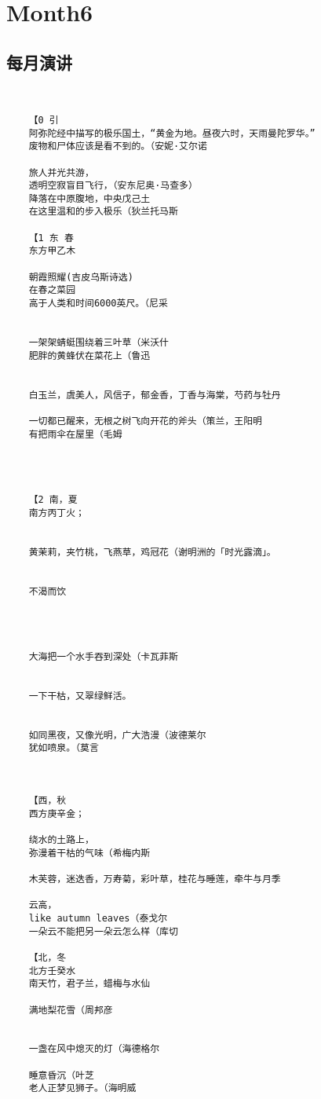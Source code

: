 \documentclass[UTF8]{Diaries}
\begin{document}
\section{Month6}
\subsection{每月演讲}
\begin{lstlisting}


    【0 引
    阿弥陀经中描写的极乐国土，“黄金为地。昼夜六时，天雨曼陀罗华。”
    废物和尸体应该是看不到的。（安妮·艾尔诺

    旅人并光共游，
    透明空寂盲目飞行，（安东尼奥·马查多）
    降落在中原腹地，中央戊己土
    在这里温和的步入极乐（狄兰托马斯

    【1 东 春
    东方甲乙木

    朝霞照耀(吉皮乌斯诗选)
    在春之菜园
    高于人类和时间6000英尺。（尼采


    一架架蜻蜓围绕着三叶草（米沃什
    肥胖的黄蜂伏在菜花上（鲁迅

   
    白玉兰，虞美人，风信子，郁金香，丁香与海棠，芍药与牡丹
    
    一切都已醒来，无根之树飞向开花的斧头（策兰，王阳明
    有把雨伞在屋里（毛姆
    

    

    【2 南，夏
    南方丙丁火；


    黄茉莉，夹竹桃，飞燕草，鸡冠花（谢明洲的「时光露滴」。


    不渴而饮

    
    
    
    大海把一个水手吞到深处（卡瓦菲斯
    
    
    一下干枯，又翠绿鲜活。
    
    
    如同黑夜，又像光明，广大浩漫（波德莱尔
    犹如喷泉。（莫言

    
    
    【西，秋
    西方庚辛金；

    绕水的土路上，
    弥漫着干枯的气味（希梅内斯

    木芙蓉，迷迭香，万寿菊，彩叶草，桂花与睡莲，牵牛与月季

    云高，
    like autumn leaves（泰戈尔
    一朵云不能把另一朵云怎么样（库切

    【北，冬
    北方壬癸水
    南天竹，君子兰，蜡梅与水仙

    满地梨花雪（周邦彦
    

    一盏在风中熄灭的灯（海德格尔

    睡意昏沉（叶芝
    老人正梦见狮子。（海明威


\end{lstlisting}
\end{document}
